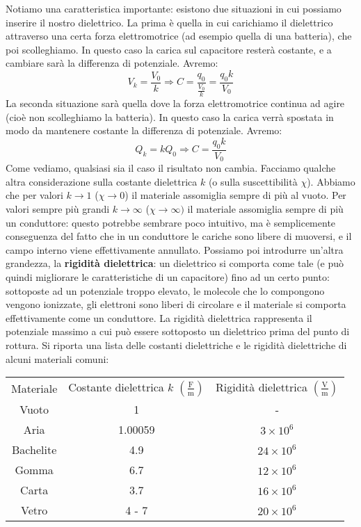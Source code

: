 \documentclass[a4paper,12pt]{article}
\begin{document}
Notiamo una caratteristica importante: esistono due situazioni in cui possiamo inserire il nostro dielettrico. La prima è quella in cui carichiamo il dielettrico attraverso una certa forza elettromotrice (ad esempio quella di una batteria), che poi
scolleghiamo. In questo caso la carica sul capacitore resterà costante, e a cambiare sarà la differenza di potenziale. Avremo:
$$ V_k = \frac{V_0}{k} \Rightarrow C = \frac{q_0}{\frac{V_0}{k}} = \frac{q_0 k}{V_0} $$
La seconda situazione sarà quella dove la forza elettromotrice continua ad agire (cioè non scolleghiamo la batteria). In questo caso la carica verrà spostata in modo da mantenere costante la differenza di potenziale. Avremo:
$$ Q_k = kQ_0 \Rightarrow C = \frac{q_0 k}{V_0} $$
Come vediamo, qualsiasi sia il caso il risultato non cambia.
Facciamo qualche altra considerazione sulla costante dielettrica $k$ (o sulla suscettibilità $\chi$). Abbiamo che per valori $k \rightarrow 1$ ($\chi \rightarrow 0$) il materiale assomiglia sempre di più al vuoto. Per valori sempre più grandi
$k \rightarrow \infty$ ($\chi \rightarrow \infty)$ il materiale assomiglia sempre di più un conduttore: questo potrebbe sembrare poco intuitivo, ma è semplicemente conseguenza del fatto che in un conduttore le cariche sono libere di muoversi, e il campo
interno viene effettivamente annullato. Possiamo poi introdurre un'altra grandezza, la \textbf{rigidità dielettrica}: un dielettrico si comporta come tale (e può quindi migliorare le caratteristiche di un capacitore) fino ad un certo punto:
sottoposte ad un potenziale troppo elevato, le molecole che lo compongono vengono ionizzate, gli elettroni sono liberi di circolare e il materiale si comporta effettivamente come un conduttore. La rigidità dielettrica rappresenta il potenziale massimo a cui può essere
sottoposto un dielettrico prima del punto di rottura. Si riporta una lista delle costanti dielettriche e le rigidità
dielettriche di alcuni materiali comuni:
\begin{center}
\begin{tabular}{|c|c|c|}
  Materiale & Costante dielettrica $k$ $\left(\mathrm{\frac{F}{m}}\right)$ & Rigidità dielettrica $\left(\mathrm{\frac{V}{m}}\right)$ \\
  Vuoto & 1 & - \\
  Aria & 1.00059 & $3\times 10^6$ \\
  Bachelite & 4.9 & $24\times 10^6$ \\
  Gomma & 6.7 & $12\times 10^6$ \\
  Carta & 3.7 & $16\times 10^6$ \\
  Vetro & 4 - 7 & $20\times 10^6$ \\
\end{tabular}
\end{center}
\end{document}
